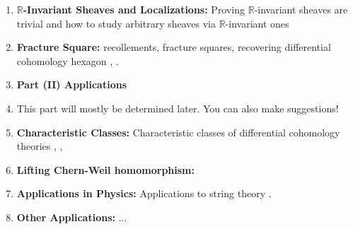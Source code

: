 \documentclass[10pt]{amsart}
\begin{document}
\begin{enumerate}[itemsep=0.3cm]
	\item \textbf{$\mathbb{R}$-Invariant Sheaves and Localizations:} Proving $\mathbb{R}$-invariant sheaves are trivial \cite[Section 4]{adh2021differentialcohomology} and how to study arbitrary sheaves via $\mathbb{R}$-invariant ones \cite[Section 5]{adh2021differentialcohomology}
	\item \textbf{Fracture Square:} recollements, fracture squares, recovering differential cohomology hexagon \cite[Section 6]{adh2021differentialcohomology}, \cite{barwickglasman2016recollements,lurie2018sag}.
	\item[] \textbf{\large Part (II) Applications} 
	\item[] This part will mostly be determined later. You can also make suggestions!
	\item \textbf{Characteristic Classes:} Characteristic classes of differential cohomology theories \cite[Section 14]{adh2021differentialcohomology}, \cite{bunkenikolausvoelkl2016differentialcohomology}, \cite[Section 2]{debray2023diffcoh}
	\item \textbf{Lifting Chern-Weil homomorphism:} \cite[Section 13, Section 15]{adh2021differentialcohomology}
	\item \textbf{Applications in Physics:} Applications to string theory \cite{freed2002ktheoryqft}.
	\item \textbf{Other Applications:} ... 
\end{enumerate}

{\footnotesize


}
\end{document}
